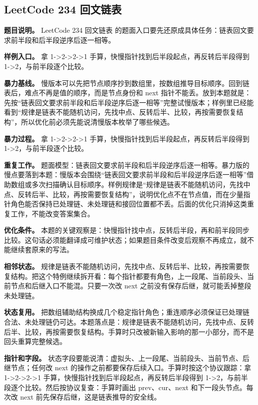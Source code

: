 \subsection{LeetCode 234 回文链表}

\textbf{题目说明。} LeetCode 234 回文链表 的题面入口要先还原成具体任务：链表回文要求前半段和后半段逆序后逐一相等。

\textbf{样例入口。} 拿 1->2->2->1 手算，快慢指针找到后半段起点，再反转后半段得到 1->2，与前半段逐个比较。

\textbf{暴力基线。} 慢版本可以先把节点顺序抄到数组里，按数组推导目标顺序。回到链表后，难点不再是值的顺序，而是节点身份和 next 指针不能丢。放到本题就是：先按“链表回文要求前半段和后半段逆序后逐一相等”完整试慢版本；样例里已经能看到“规律是链表不能随机访问，先找中点、反转后半、比较，再按需要恢复结构”，所以优化前必须先能说清慢版本枚举了哪些候选。

\textbf{暴力过程。} 拿 1->2->2->1 手算，快慢指针找到后半段起点，再反转后半段得到 1->2，与前半段逐个比较。

\textbf{重复工作。} 题面模型：链表回文要求前半段和后半段逆序后逐一相等。暴力版的慢点要落到本题：慢版本会围绕“链表回文要求前半段和后半段逆序后逐一相等”借助数组或多次扫描确认目标顺序。样例规律是“规律是链表不能随机访问，先找中点、反转后半、比较，再按需要恢复结构”，说明优化点不在节点值，而在少量指针角色能否保持已处理链、未处理链和接回位置都不丢。后面的优化只消掉这类重复工作，不能改变答案集合。

\textbf{优化条件。} 本题的关键观察是：快慢指针找中点，反转后半段，再和前半段同步比较。这句话必须能翻译成可维护状态；如果题目条件改变后观察不再成立，就不能继续套原来的写法。

\textbf{相邻状态。} 规律是链表不能随机访问，先找中点、反转后半、比较，再按需要恢复结构。把这个特例继续拆开看：每个指针都要有角色，上一段尾、当前段头、当前节点和后继入口不能混。只要一次改 next 之前没有保存后继，就可能丢掉整段未处理链。

\textbf{状态复用。} 把数组辅助结构换成几个稳定指针角色；重连顺序必须保证已处理链合法、未处理链仍可达。本题落点是：规律是链表不能随机访问，先找中点、反转后半、比较，再按需要恢复结构。手算时只改被新输入影响的那一小部分，而不是回头重算完整候选。

\textbf{指针和字段。} 状态字段要能说清：虚拟头、上一段尾、当前段头、当前节点、后继节点；任何改 next 的操作之前都要保存后续入口。手算时按这个协议跟踪：拿 1->2->2->1 手算，快慢指针找到后半段起点，再反转后半段得到 1->2，与前半段逐个比较。然后按协议复查：手算时画出 prev、cur、next 和下一段头节点。每次改 next 前先保存后继，这是链表推导的安全线。

